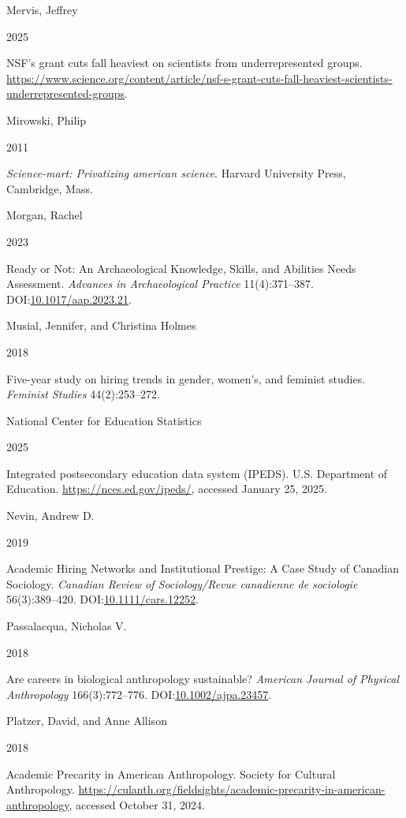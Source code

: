\documentclass[
  12pt,
]{article}
\newlength{\cslhangindent}
\newlength{\csllabelwidth}
\newenvironment{CSLReferences}[2] %
 {\begin{list}{}{%
  \setlength{\itemindent}{0pt}
  \setlength{\leftmargin}{0pt}
  \setlength{\parsep}{0pt}
  \ifodd #1
   \setlength{\leftmargin}{\cslhangindent}
   \setlength{\itemindent}{-1\cslhangindent}
  \fi
  \setlength{\itemsep}{#2\baselineskip}}}
 {\end{list}}
\newcommand{\CSLBlock}[1]{\hfill\break\parbox[t]{\linewidth}{\strut\ignorespaces#1\strut}}
\newcommand{\CSLLeftMargin}[1]{\parbox[t]{\csllabelwidth}{\strut#1\strut}}
\newcommand{\CSLRightInline}[1]{\parbox[t]{\linewidth - \csllabelwidth}{\strut#1\strut}}
\begin{document}
\begin{CSLReferences}{0}{1}
\CSLBlock{Mervis, Jeffrey}
\CSLLeftMargin{ 2025}%
\CSLRightInline{NSF's grant cuts fall heaviest on scientists from
underrepresented groups.
\url{https://www.science.org/content/article/nsf-s-grant-cuts-fall-heaviest-scientists-underrepresented-groups}.}

\CSLBlock{Mirowski, Philip}
\CSLLeftMargin{ 2011}%
\CSLRightInline{\emph{Science-mart: Privatizing american science}.
Harvard University Press, Cambridge, Mass.}

\CSLBlock{Morgan, Rachel}
\CSLLeftMargin{ 2023}%
\CSLRightInline{Ready or Not: An Archaeological Knowledge, Skills, and
Abilities Needs Assessment. \emph{Advances in Archaeological Practice}
11(4):371--387.
DOI:\href{https://doi.org/10.1017/aap.2023.21}{10.1017/aap.2023.21}.}

\CSLBlock{Musial, Jennifer, and Christina Holmes}
\CSLLeftMargin{ 2018}%
\CSLRightInline{Five-year study on hiring trends in gender, women's, and
feminist studies. \emph{Feminist Studies} 44(2):253--272.}

\CSLBlock{National Center for Education Statistics}
\CSLLeftMargin{ 2025}%
\CSLRightInline{Integrated postsecondary education data system (IPEDS).
U.S. Department of Education. \url{https://nces.ed.gov/ipeds/}, accessed
January 25, 2025.}

\CSLBlock{Nevin, Andrew D.}
\CSLLeftMargin{ 2019}%
\CSLRightInline{Academic Hiring Networks and Institutional Prestige: A
Case Study of Canadian Sociology. \emph{Canadian Review of
Sociology/Revue canadienne de sociologie} 56(3):389--420.
DOI:\href{https://doi.org/10.1111/cars.12252}{10.1111/cars.12252}.}

\CSLBlock{Passalacqua, Nicholas V.}
\CSLLeftMargin{ 2018}%
\CSLRightInline{Are careers in biological anthropology sustainable?
\emph{American Journal of Physical Anthropology} 166(3):772--776.
DOI:\href{https://doi.org/10.1002/ajpa.23457}{10.1002/ajpa.23457}.}

\CSLBlock{Platzer, David, and Anne Allison}
\CSLLeftMargin{ 2018}%
\CSLRightInline{Academic {Precarity} in {American Anthropology}. Society
for Cultural Anthropology.
\url{https://culanth.org/fieldsights/academic-precarity-in-american-anthropology},
accessed October 31, 2024.}


\end{CSLReferences}
\end{document}
